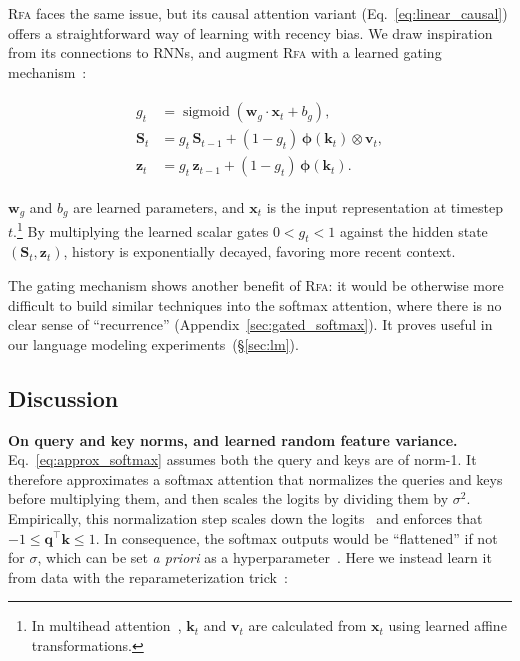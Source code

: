 \textsc{Rfa} faces the same issue, but its causal attention variant (Eq.~\ref{eq:linear_causal})
offers a straightforward way of learning with recency bias. We draw inspiration from its connections to RNNs, and augment \textsc{Rfa} with a learned gating mechanism~\citep[\emph{inter alia}]{hochreiter1997lstm,cho2014gru,peng2018rational}:

\begin{align}\label{eq:gate_rfa}
\begin{split}
    g_t &= \operatorname{sigmoid}( {\mathbf{w}}_g\cdot {\mathbf{x}}_t+ b_g), \\
    {\mathbf{S}}_t &= g_t\, {\mathbf{S}}_{t-1} +  (1-g_t)\,\boldsymbol{\phi}\left({\mathbf{k}}_t\right)\otimes{\mathbf{v}}_t, \\
    {\mathbf{z}}_t &= g_t\, {\mathbf{z}}_{t-1} + (1-g_t)\,\boldsymbol{\phi}\left({\mathbf{k}}_t\right).
\end{split}
\end{align}

${\mathbf{w}}_g$ and $b_g$ are learned parameters, and ${\mathbf{x}}_t$ is the input representation at timestep $t$.\footnote{
In multihead attention~\citep{vaswani2017attention},
${\mathbf{k}}_t$ and ${\mathbf{v}}_t$ are calculated from ${\mathbf{x}}_t$
using learned affine transformations. } By multiplying the learned scalar gates $0< g_t<1$ against the hidden state $({\mathbf{S}}_t, {\mathbf{z}}_t)$,
history is exponentially decayed, favoring more recent context.

The gating mechanism shows another benefit of \textsc{Rfa}:
it would be otherwise more difficult to build similar techniques into the softmax attention, where there is no clear sense of ``recurrence'' (Appendix~\ref{sec:gated_softmax}).
It proves useful in our language modeling experiments~(\S\ref{sec:lm}).

\subsection{Discussion}\label{sec:discussion}
\textbf{On query and key norms, and learned random feature variance.}
Eq.~\ref{eq:approx_softmax} assumes both the query and keys are of norm-1. It therefore approximates a softmax attention that normalizes the queries and keys before multiplying them, and then scales the logits by dividing them by $\sigma^2$.
Empirically, this normalization step scales down the logits~\citep{vaswani2017attention} and enforces that $-1\leq{\mathbf{q}}^\top{\mathbf{k}}\leq1$.
In consequence, the softmax outputs would be ``flattened'' if not for $\sigma$,
which can be set \emph{a priori} as a hyperparameter~\citep[\emph{inter alia}]{yu2016orf,avron2017faster,sun2019random}. Here we instead learn it from data with the reparameterization trick~\citep{kingma2014vae}:

